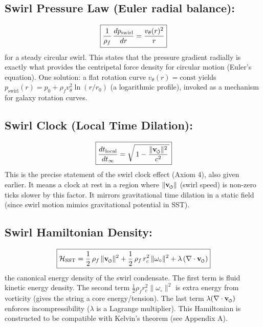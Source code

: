 \documentclass[reprint,aps,onecolumn,nofootinbib]{revtex4-2}
\newcommand{\swirlarrow}{%
    \mathchoice{\mkern-2mu\scriptstyle\boldsymbol{\circlearrowleft}}%
    {\mkern-2mu\scriptstyle\boldsymbol{\circlearrowleft}}%
    {\mkern-2mu\scriptscriptstyle\boldsymbol{\circlearrowleft}}%
    {\mkern-2mu\scriptscriptstyle\boldsymbol{\circlearrowleft}}%
}
\newcommand{\vswirl}{\mathbf{v}_{\swirlarrow}}
\begin{document}
        \subsection{Swirl Pressure Law (Euler radial balance):}
            \[
                \boxed{%
                    \frac{1}{\rho_f}\,\frac{d p_{\text{swirl}}}{dr} = \frac{v_{\theta}(r)^2}{r}
                }
            \]
            for a steady circular swirl. This states that the pressure gradient radially is exactly what provides the centripetal force density for circular motion (Euler’s equation). One solution: a flat rotation curve $v_{\theta}(r)=\text{const}$ yields $p_{\text{swirl}}(r) = p_0 + \rho_f v_{\theta}^2 \ln(r/r_0)$ (a logarithmic profile), invoked as a mechanism for galaxy rotation curves.

        \subsection{Swirl Clock (Local Time Dilation):}
            \[
                \boxed{%
                    \frac{dt_{\text{local}}}{dt_{\infty}} = \sqrt{\,1 - \frac{\|\vswirl\|^2}{c^2}\,}
                }
            \]
            This is the precise statement of the swirl clock effect (Axiom 4), also given earlier. It means a clock at rest in a region where $\|\vswirl\|$ (swirl speed) is non-zero ticks slower by this factor. It mirrors gravitational time dilation in a static field (since swirl motion mimics gravitational potential in SST).

        \subsection{Swirl Hamiltonian Density:}
            \[
                \boxed{%
                    \mathcal{H}_{\text{SST}} =
                    \frac{1}{2}\,\rho_f\,\|\vswirl\|^2 +
                    \frac{1}{2}\,\rho_f\,r_c^2\,\|\omega_{\circ}\|^2 +
                    \lambda\,(\nabla \cdot \vswirl)
                }
            \]
            the canonical energy density of the swirl condensate. The first term is fluid kinetic energy density. The second term $\frac{1}{2}\rho_f r_c^2 \|\omega_{\circ}\|^2$ is extra energy from vorticity (gives the string a core energy/tension). The last term $\lambda(\nabla\cdot\vswirl)$ enforces incompressibility ($\lambda$ is a Lagrange multiplier). This Hamiltonian is constructed to be compatible with Kelvin’s theorem (see Appendix A).
\end{document}

